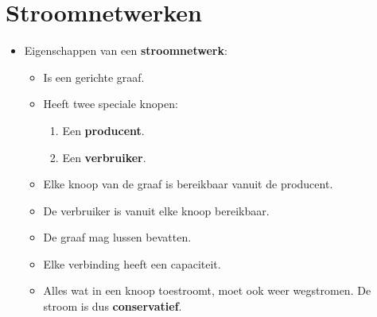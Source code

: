 \chapter{Stroomnetwerken}
\begin{itemize}
    \item Eigenschappen van een \textbf{stroomnetwerk}:
    \begin{itemize}
        \item Is een gerichte graaf.
        \item Heeft twee speciale knopen:
        \begin{enumerate}
            \item Een \textbf{producent}.
            \item Een \textbf{verbruiker}.
        \end{enumerate}
        \item Elke knoop van de graaf is bereikbaar vanuit de producent.
        \item De verbruiker is vanuit elke knoop bereikbaar.
        \item De graaf mag lussen bevatten.
        \item Elke verbinding heeft een capaciteit.
   
        \item Alles wat in een knoop toestroomt, moet ook weer wegstromen. De stroom is dus \textbf{conservatief}.
    \end{itemize}
\end{itemize}

